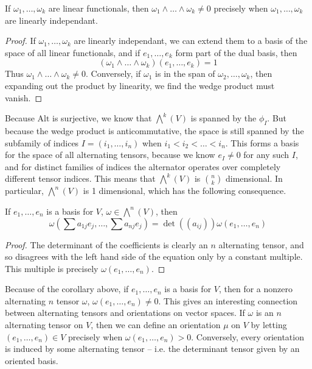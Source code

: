 \begin{corollary}
    If $\omega_1, \dots, \omega_k$ are linear functionals, then $\omega_1 \wedge \dots \wedge \omega_k \neq 0$ precisely when $\omega_1, \dots, \omega_k$ are linearly independant.
\end{corollary}
\begin{proof}
    If $\omega_1, \dots, \omega_k$ are linearly independant, we can extend them to a basis of the space of all linear functionals, and if $e_1, \dots, e_k$ form part of the dual basis, then
    \[ (\omega_1 \wedge \dots \wedge \omega_k)(e_1, \dots, e_k) = 1 \]
    Thus $\omega_1 \wedge \dots \wedge \omega_k \neq 0$. Conversely, if $\omega_1$ is in the span of $\omega_2, \dots, \omega_k$, then expanding out the product by linearity, we find the wedge product must vanish.
\end{proof}

Because $\text{Alt}$ is surjective, we know that $\bigwedge^k(V)$ is spanned by the $\phi_I$. But because the wedge product is anticommutative, the space is still spanned by the subfamily of indices $I = (i_1, \dots, i_n)$ when $i_1 < i_2 < \dots < i_n$. This forms a basis for the space of all alternating tensors, because we know $e_I \neq 0$ for any such $I$, and for distinct families of indices the alternator operates over completely different tensor indices. This means that $\bigwedge^k(V)$ is ${n \choose k}$ dimensional. In particular, $\bigwedge^n(V)$ is 1 dimensional, which has the following consequence.

\begin{corollary}
    If $e_1, \dots, e_n$ is a basis for $V$, $\omega \in \bigwedge^n(V)$, then
    \[ \omega \left(\sum a_{1j} e_j, \dots, \sum a_{nj} e_j \right) = \det((a_{ij})) \omega(e_1, \dots, e_n) \]
\end{corollary}
\begin{proof}
    The determinant of the coefficients is clearly an $n$ alternating tensor, and so disagrees with the left hand side of the equation only by a constant multiple. This multiple is precisely $\omega(e_1, \dots, e_n)$.
\end{proof}

Because of the corollary above, if $e_1, \dots, e_n$ is a basis for $V$, then for a nonzero alternating $n$ tensor $\omega$, $\omega(e_1, \dots, e_n) \neq 0$. This gives an interesting connection between alternating tensors and orientations on vector spaces. If $\omega$ is an $n$ alternating tensor on $V$, then we can define an orientation $\mu$ on $V$ by letting $(e_1, \dots, e_n) \in V$ precisely when $\omega(e_1, \dots, e_n) > 0$. Conversely, every orientation is induced by some alternating tensor -- i.e. the determinant tensor given by an oriented basis.

